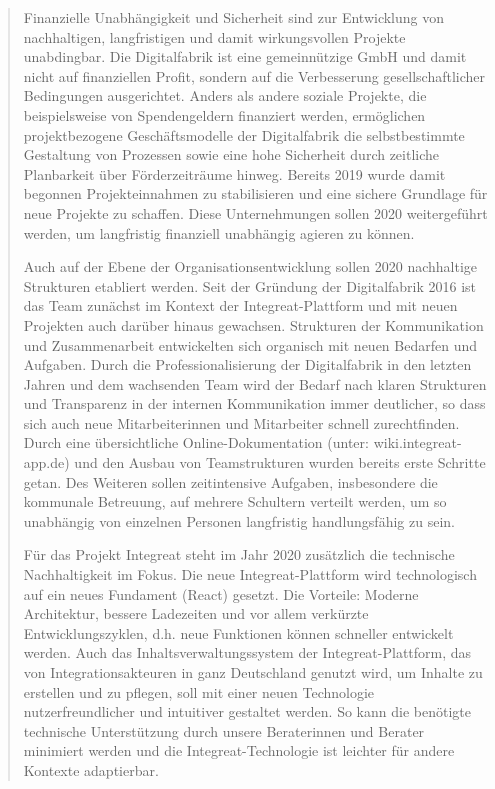 \documentclass[12pt, a4paper]{article} %
\begin{document}
\begin{quote}
Finanzielle Unabhängigkeit und Sicherheit sind zur Entwicklung von
nachhaltigen, langfristigen und damit wirkungsvollen Projekte
unabdingbar. Die Digitalfabrik ist eine gemeinnützige GmbH und damit
nicht auf finanziellen Profit, sondern auf die Verbesserung
gesellschaftlicher Bedingungen ausgerichtet. Anders als andere soziale
Projekte, die beispielsweise von Spendengeldern finanziert werden,
ermöglichen projektbezogene Geschäftsmodelle der Digitalfabrik die
selbstbestimmte Gestaltung von Prozessen sowie eine hohe Sicherheit
durch zeitliche Planbarkeit über Förderzeiträume hinweg. Bereits 2019
wurde damit begonnen Projekteinnahmen zu stabilisieren und eine sichere
Grundlage für neue Projekte zu schaffen. Diese Unternehmungen sollen
2020 weitergeführt werden, um langfristig finanziell unabhängig agieren
zu können.

Auch auf der Ebene der Organisationsentwicklung sollen 2020 nachhaltige
Strukturen etabliert werden. Seit der Gründung der Digitalfabrik 2016
ist das Team zunächst im Kontext der Integreat-Plattform und mit neuen
Projekten auch darüber hinaus gewachsen. Strukturen der Kommunikation
und Zusammenarbeit entwickelten sich organisch mit neuen Bedarfen und
Aufgaben. Durch die Professionalisierung der Digitalfabrik in den
letzten Jahren und dem wachsenden Team wird der Bedarf nach klaren
Strukturen und Transparenz in der internen Kommunikation immer
deutlicher, so dass sich auch neue Mitarbeiterinnen und Mitarbeiter
schnell zurechtfinden. Durch eine übersichtliche Online-Dokumentation
(unter: wiki.integreat-app.de) und den Ausbau von Teamstrukturen wurden
bereits erste Schritte getan. Des Weiteren sollen zeitintensive
Aufgaben, insbesondere die kommunale Betreuung, auf mehrere Schultern
verteilt werden, um so unabhängig von einzelnen Personen langfristig
handlungsfähig zu sein.

Für das Projekt Integreat steht im Jahr 2020 zusätzlich die technische
Nachhaltigkeit im Fokus. Die neue Integreat-Plattform wird technologisch
auf ein neues Fundament (React) gesetzt. Die Vorteile: Moderne
Architektur, bessere Ladezeiten und vor allem verkürzte
Entwicklungszyklen, d.h. neue Funktionen können schneller entwickelt
werden. Auch das Inhaltsverwaltungssystem der Integreat-Plattform, das
von Integrationsakteuren in ganz Deutschland genutzt wird, um Inhalte zu
erstellen und zu pflegen, soll mit einer neuen Technologie
nutzerfreundlicher und intuitiver gestaltet werden. So kann die
benötigte technische Unterstützung durch unsere Beraterinnen und Berater
minimiert werden und die Integreat-Technologie ist leichter für andere
Kontexte adaptierbar.
\end{quote}
\end{document}
